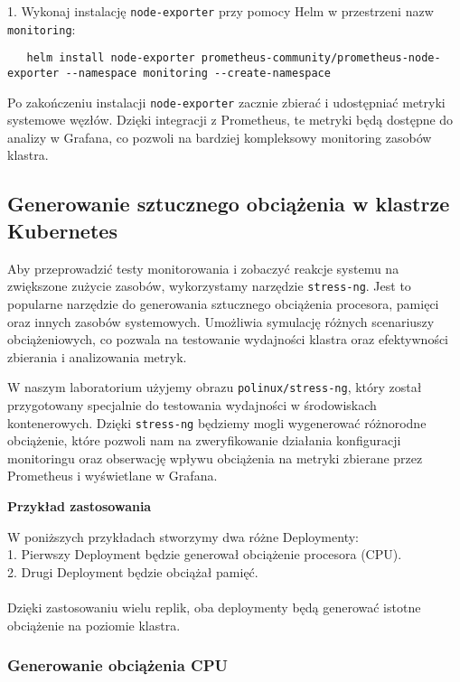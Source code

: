 \documentclass{article}
\begin{document}
1. Wykonaj instalację \texttt{node-exporter} przy pomocy Helm w przestrzeni nazw \texttt{monitoring}:
   \begin{lstlisting}
   helm install node-exporter prometheus-community/prometheus-node-exporter --namespace monitoring --create-namespace
   \end{lstlisting}

Po zakończeniu instalacji \texttt{node-exporter} zacznie zbierać i udostępniać metryki systemowe węzłów. Dzięki integracji z Prometheus, te metryki będą dostępne do analizy w Grafana, co pozwoli na bardziej kompleksowy monitoring zasobów klastra.

\subsection{Generowanie sztucznego obciążenia w klastrze Kubernetes}

Aby przeprowadzić testy monitorowania i zobaczyć reakcje systemu na zwiększone zużycie zasobów, wykorzystamy narzędzie \texttt{stress-ng}. Jest to popularne narzędzie do generowania sztucznego obciążenia procesora, pamięci oraz innych zasobów systemowych. Umożliwia symulację różnych scenariuszy obciążeniowych, co pozwala na testowanie wydajności klastra oraz efektywności zbierania i analizowania metryk.

W naszym laboratorium użyjemy obrazu \texttt{polinux/stress-ng}, który został przygotowany specjalnie do testowania wydajności w środowiskach kontenerowych. Dzięki \texttt{stress-ng} będziemy mogli wygenerować różnorodne obciążenie, które pozwoli nam na zweryfikowanie działania konfiguracji monitoringu oraz obserwację wpływu obciążenia na metryki zbierane przez Prometheus i wyświetlane w Grafana.

\textbf{Przykład zastosowania}

W poniższych przykładach stworzymy dwa różne Deploymenty:\\
1. Pierwszy Deployment będzie generował obciążenie procesora (CPU).\\
2. Drugi Deployment będzie obciążał pamięć.\\
\\
Dzięki zastosowaniu wielu replik, oba deploymenty będą generować istotne obciążenie na poziomie klastra.

\subsubsection{Generowanie obciążenia CPU}
\end{document}
